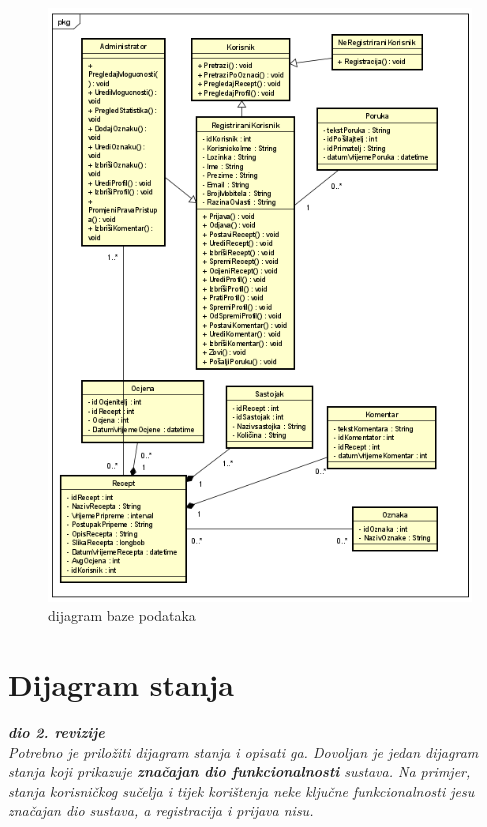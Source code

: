 		\begin{figure}[H]
			\includegraphics[scale=1.3]{slike/dijagram_razreda2.png} %
			\centering
			\caption{dijagram baze podataka}
			\label{fig:Dijagram_razreda2}
		\end{figure}
			
			
			\eject
		
		\section{Dijagram stanja}
			
			
			\textbf{\textit{dio 2. revizije}}\\
			
			\textit{Potrebno je priložiti dijagram stanja i opisati ga. Dovoljan je jedan dijagram stanja koji prikazuje \textbf{značajan dio funkcionalnosti} sustava. Na primjer, stanja korisničkog sučelja i tijek korištenja neke ključne funkcionalnosti jesu značajan dio sustava, a registracija i prijava nisu. }
			
